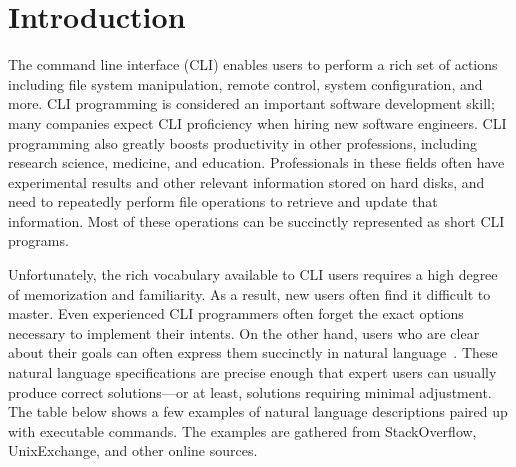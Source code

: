 \section{Introduction}


The command line interface (CLI) enables users to perform a rich set of actions including file system manipulation, remote control, system configuration, and more. CLI programming is considered an important software development skill; many companies expect CLI proficiency when hiring new software engineers. CLI programming also greatly boosts productivity in other professions, including research science, medicine, and education. Professionals in these fields often have experimental results and other relevant information stored on hard disks, and need to repeatedly perform file operations to retrieve and update that information. Most of these operations can be succinctly represented as short CLI programs.

Unfortunately, the rich vocabulary available to CLI users requires a high degree of memorization and familiarity. As a result, new users often find it difficult to master. Even experienced CLI programmers often forget the exact options necessary to implement their intents. On the other hand,
users who are clear about their goals can often express them succinctly in natural language~\cite{Myers:2004:NPL:1015864.1015888}.
These natural language specifications are precise enough that expert users can
usually produce correct solutions---or at least, solutions requiring minimal
adjustment. The table below shows a few examples of natural language
descriptions paired up with executable commands. The examples are gathered from
StackOverflow, UnixExchange, and other online sources.


